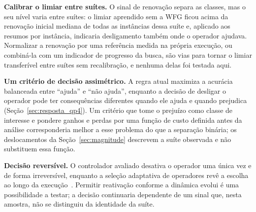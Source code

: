 \textbf{Calibrar o limiar entre suítes.} O sinal de renovação separa as classes, mas o seu nível varia entre suítes: o limiar aprendido sem a WFG ficou acima da renovação inicial mediana de todas as instâncias dessa suíte e, aplicado aos resumos por instância, indicaria desligamento também onde o operador ajudava. Normalizar a renovação por uma referência medida na própria execução, ou combiná-la com um indicador de progresso da busca, são vias para tornar o limiar transferível entre suítes sem recalibração, e nenhuma delas foi testada aqui.

\textbf{Um critério de decisão assimétrico.} A regra atual maximiza a acurácia balanceada entre ``ajuda'' e ``não ajuda'', enquanto a decisão de desligar o operador pode ter consequências diferentes quando ele ajuda e quando prejudica (Seção~\ref{sec:resposta_qp4}). Um critério que tome o prejuízo como classe de interesse e pondere ganhos e perdas por uma função de custo definida antes da análise corresponderia melhor a esse problema do que a separação binária; os deslocamentos da Seção~\ref{sec:magnitude} descrevem a suíte observada e não substituem essa função.

\textbf{Decisão reversível.} O controlador avaliado desativa o operador uma única vez e de forma irreversível, enquanto a seleção adaptativa de operadores revê a escolha ao longo da execução~\cite{fialho2008adaptive,maturana2009adaptive}. Permitir reativação conforme a dinâmica evolui é uma possibilidade a testar; a decisão continuaria dependente de um sinal que, nesta amostra, não se distinguiu da identidade da suíte.
